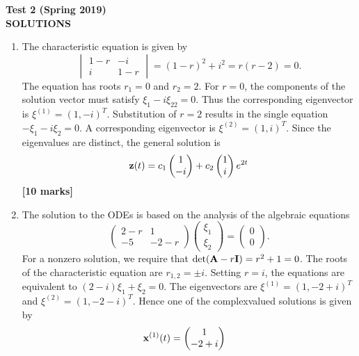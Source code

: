 \documentclass[11pt,a4paper]{article}
\newcommand{\mrk}[1]{\hfill\textbf{[#1 marks]}}
\begin{document}
	\begin{center}
		\textbf{\large Test 2 (Spring 2019)}\\[0.15cm]
		\textbf{\large SOLUTIONS}
	\end{center}
	\begin{enumerate}
		\item The characteristic equation is given by
		$$
		\begin{vmatrix}
			1 - r & -i\\
			i & 1 - r
		\end{vmatrix} 
		= (1 - r)^2 + i^2 = r(r - 2) = 0.
		$$
		The equation has roots $r_1 = 0$ and $r_2 = 2$. For $r = 0$, the components of the solution vector must satisfy $\xi_1 − i\xi_22 = 0$. Thus the corresponding eigenvector is $\xi^{(1)} = (1, −i)^T$. Substitution of $r = 2$ results in the single equation $-\xi_1 - i\xi_2 = 0$. A corresponding eigenvector is $\xi^{(2)} = (1, i)^T$. Since the eigenvalues are distinct, the general solution is
		$$
		\vb{z}(t) = c_1
		\begin{pmatrix}
			1\\
			-i
		\end{pmatrix} + c_2
		\begin{pmatrix}
			1\\
			i
		\end{pmatrix}e^{2t}
		$$
		\mrk{10}
		\item The solution to the ODEs is based on the analysis of the algebraic equations
		$$
		\begin{pmatrix}
			2 - r & 1\\
			-5 & -2 - r
		\end{pmatrix}
		\begin{pmatrix}
			\xi_1\\
			\xi_2
		\end{pmatrix} =
		\begin{pmatrix}
			0\\
			0
		\end{pmatrix}.
		$$
		For a nonzero solution, we require that $\det(\vb{A} - r\vb{I}) = r^2 + 1 = 0$. The roots of the characteristic equation are $r_{1,2} = \pm i$. Setting $r = i$, the equations are equivalent to $(2 - i)\xi_1 + \xi_2 = 0$. The eigenvectors are $\xi^{(1)} = (1, -2 + i)^T$ and $\xi^(2) = (1, -2 - i)^T$. Hence one of the complexvalued solutions is given by
		\begin{align*}
			\vb{x}^{(1)}(t)
			&=
			\begin{pmatrix}
				1\\
				-2 + i

\end{pmatrix}
\end{align*}
\end{enumerate}
\end{document}
